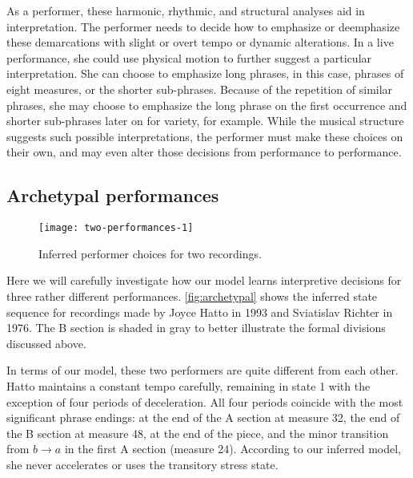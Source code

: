 \documentclass[12pt]{article}
\begin{document}
As a performer, these harmonic, rhythmic, and structural analyses aid
in interpretation. The performer needs to decide how to emphasize or
deemphasize these demarcations with slight or overt tempo or dynamic
alterations. In a live performance, she could use physical motion to
further suggest a particular interpretation. She can choose to
emphasize long phrases, in this 
case, phrases of eight measures, or the shorter sub-phrases. Because
of the repetition of similar phrases, she may choose to emphasize the
long phrase on the first occurrence and shorter sub-phrases later on
for variety, for example. While the musical structure suggests such
possible interpretations, the performer must make these choices on
their own, and may even alter those decisions from performance to
performance.



\subsection{Archetypal performances}
\label{sec:arch-perf}


\begin{figure}[t]
  \centering
  \texttt{[image: two-performances-1]}
  \caption{Inferred performer choices for two recordings. }
  \label{fig:archetypal}
\end{figure}
Here we will carefully investigate how our model learns interpretive
decisions for three rather different performances. \autoref{fig:archetypal} shows the inferred state sequence for
recordings made by Joyce Hatto in 1993 and Sviatislav Richter in
1976. The B section is
shaded in gray to better illustrate the formal divisions discussed above.

In terms of our model, these two performers are quite different
from each other. Hatto maintains a constant tempo carefully, remaining
in state 1 with the exception of four periods of deceleration. All
four periods coincide with the most significant phrase endings: at the
end of the A section at measure 32, the end of the B section at
measure 48, at the end of the piece, and the minor transition from
$b\rightarrow a$ in the first A section (measure 24). According
to our inferred model, she never accelerates or uses the transitory
stress state.
\end{document}
